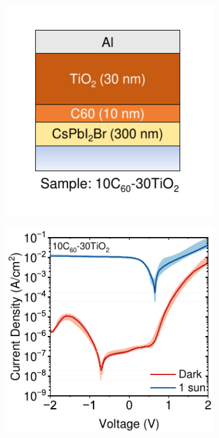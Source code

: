 \begin{figure}[t]
\begin{subfigure}[t]{0.24\textwidth}
        \caption{}
        \label{}
    \end{subfigure}
    \caption{}
    \label{}
\end{figure}



\begin{figure}[t]
    \centering
    \begin{subfigure}[t]{0.4\textwidth}
        \centering
        \includegraphics[width=\textwidth]{chapters/transport_layers/images/Sample_10_30_icon.pdf} %
        \caption{}
        \label{}
    \end{subfigure}
    \hfill
    \begin{subfigure}[t]{0.4\textwidth}
        \centering
        \includegraphics[width=\textwidth]{chapters/transport_layers/images/JV_Median_10_30.pdf} 

\end{subfigure}
\end{figure}
